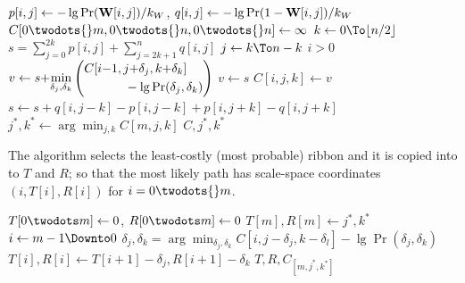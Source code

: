 \begin{codebox}
 \label{alg:segmet-ribbin}
\li $p[i,j]\gets -\lg \Pr(\mathbf{W}{}[i,j])/k_W{}$, 
          \hspace{2ex} $q[i,j] \gets -\lg \Pr(1-\mathbf{W}{}[i,j])/k_W{}$
\li $C{[0\twodots{}m, 0\twodots{}n, 0\twodots{}n]} \gets \infty$
\li {} \Do                                                \label{li:loop-slices}
\li     \For $k \gets 0 \To \lfloor n/2 \rfloor $ \Do                          \label{li:loop-radius}
\li         $s = \displaystyle{\sum_{j=0}^{2k} p[i,j] +\sum_{j=2k+1}^n  q[i, j] }$
\li         \For $j \gets k \To n-k$ \Do  \label{li:loop-center}
\li              \If $i > 0$  \Do                                              \label{li:if-has-pred}
\li              $v \gets s {+}\displaystyle{\min_{\delta_j, \delta_k}\left(  
                              \begin{aligned}
                              C[i{-}1,j{+}\delta_j,k{+}\delta_k] \hspace{3ex}\\
                              \hfill{}-\lg \Pr(\delta_j, \delta_k)
                              \end{aligned}
                            \right)}$  
                               \label{li:min-from-pred}
\li              \Else $v\gets s$
                 \End
\li              $C{[i, j, k]} \gets v$                                       \label{li:dp-store}
\li              $s \gets s{+}q[i,j{-}k]{-}p[i, j{-}k]{+}p[i, j{+}k]{-}q[i,j{+}k]$ \label{li:update-s}
           \End
       \End
    \End
\li $j^*, k^* \gets \displaystyle{\arg\min_{j,k} C{[m, j, k]}}$
\li \Return $C, j^*, k^*$
\end{codebox}

The  algorithm selects the least-costly (most probable) ribbon and it is copied into to $T$ and $R$; so that the most likely path has scale-space coordinates $(i, T[i], R[i])$ for $i=0\twodots{}m$. 



\begin{codebox}
 \label{alg:backtrack-ribbon}
\li $T{[0{\twodots}m]} \gets 0$, \quad $R{[0{\twodots}m]} \gets 0$             
\li $T{[m]}, R{[m]} \gets j^*, k^*$ \label{li:backtrack-best-last}
\li \For $i \gets m-1 \Downto 0$ \Do
\li      $\delta_j, \delta_k = \displaystyle{\arg\min_{\delta_j,\delta_k}C{[i,j{-}\delta_j,k{-}\delta_l]}{-}\lg \Pr(\delta_j,\delta_k)}$
\li      $T{[i]}, R[i] \gets T{[i+1]}-\delta_j, R{[i+1]}-\delta_k$                                                 \label{li:backtack-choose-pred}
    \End
\li \Return $T, R, C_{[m, j^*, k^*]}$
\end{codebox}



